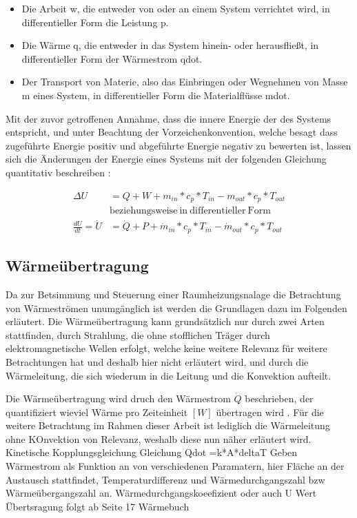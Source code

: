 \begin{itemize}
	\item Die Arbeit \gls{w}, die entweder von oder an einem System verrichtet wird, in differentieller Form die Leistung \gls{p}.
	\item Die Wärme \gls{q}, die entweder in das System hinein- oder herausfließt, in differentieller Form der Wärmestrom \gls{qdot}.
	\item Der Transport von Materie, also das Einbringen oder Wegnehmen von Masse \gls{m} eines System, in differentieller Form die Materialflüsse \gls{mdot}.
\end{itemize}

Mit der zuvor getroffenen Annahme, dass die innere Energie der des Systems entspricht, und unter Beachtung der Vorzeichenkonvention, welche besagt dass zugeführte Energie positiv und abgeführte Energie negativ zu bewerten ist, lassen sich die Änderungen der Energie eines Systems mit der folgenden Gleichung quantitativ beschreiben \cite[S.~54]{ba12}:

\begin{equation}
\label{eq:hauptsatz}
\begin{split}
\Delta U & = Q + W + m_{in}*c_{p}*T_{in}-m_{out}*c_{p}*T_{out} \\ ~& \mathrm{beziehungsweise~in~differentieller~Form}\\
\frac{dU}{dt}=\dot{U} & =\dot{Q}+P+\dot{m}_{in}*c_{p}*T_{in}-\dot{m}_{out}*c_{p}*T_{out}
\end{split}
\end{equation}


\subsection{Wärmeübertragung}

Da zur Betsimmung und Steuerung einer Raumheizungsnalage die Betrachtung von Wärmeströmen unumgänglich ist werden die Grundlagen dazu im Folgenden erläutert.
Die Wärmeübertragung kann grundsätzlich nur durch zwei Arten stattfinden, durch Strahlung, die ohne stofflichen Träger durch elektromagnetische Wellen erfolgt, welche keine weitere Relevanz für weitere Betrachtungen hat und deshalb hier nicht erläutert wird, und durch die Wärmeleitung, die sich wiederum in die Leitung und die Konvektion aufteilt. \cite[S.~3f.]{bo14}

Die Wärmeübertragung wird druch den Wärmestrom $\dot{Q}$ beschrieben, der quantifiziert wieviel Wärme pro Zeiteinheit $[W]$ übertragen wird \cite[S.~5]{bo14}.
Für die weitere Betrachtung im Rahmen dieser Arbeit ist lediglich die Wärmeleitung ohne KOnvektion von Relevanz, weshalb diese nun näher erläutert wird.
Kinetische Kopplungsgleichung\cite[S.~7]{bo14}
Gleichung Qdot =k*A*deltaT
Geben Wärmestrom als Funktion an von verschiedenen Paramatern, hier Fläche an der Austausch stattfindet, Temperaturdifferenz und Wärmedurchgangszahl bzw Wärmeübergangszahl an.
Wärmedurchgangskoeefizient oder auch U Wert
Übertsragung folgt ab Seite 17 Wärmebuch
